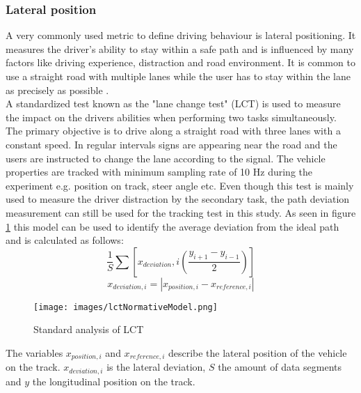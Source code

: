 \subsubsection{Lateral position}
\label{subsection:lateral position}
A very commonly used metric to define driving behaviour is lateral positioning. \autocite[37]{ostlund2005driving}
It measures the driver’s ability to stay within a safe path and is influenced by many factors like driving experience, distraction and road environment.
It is common to use a straight road with multiple lanes while the user has to stay within the lane as precisely as possible \autocite[]{iso201026022} \autocite[]{brouwer1991divided}.
\\
A standardized test known as the "lane change test" (LCT) \autocite[]{iso201026022} is used to measure the impact on the drivers abilities when performing two tasks simultaneously.
The primary objective is to drive along a straight road with three lanes with a constant speed.
In regular intervals signs are appearing near the road and the users are instructed to change the lane according to the signal.
The vehicle properties are tracked with minimum sampling rate of 10 Hz during the experiment e.g. position on track, steer angle etc.
Even though this test is mainly used to measure the driver distraction by the secondary task, the path deviation measurement can still be used for the tracking test in this study.
As seen in figure \ref{figure:LCTNormative} this model can be used to identify the average deviation from the ideal path and is calculated as follows: \autocite[13]{iso201026022}
\begin{equation}
\label{equation:LCTMeanDeviation}
	\frac{1}{S}\sum[x_{deviation},i(\frac{y_{i+1}-y_{i-1}}{2})]
\end{equation}
\begin{equation}
\label{equation:deviation}
    x_{deviation,i} = |x_{position,i} - x_{reference,i}|
\end{equation}

\begin{figure}[h]
    \centering
	\texttt{[image: images/lctNormativeModel.png]}
	\caption[
		LCT normative model
	]{
		Standard analysis of LCT \autocite[77]{ostlund2005driving}
	}
	\label{figure:LCTNormative}
\end{figure}

The variables $x_{position,i}$ and $x_{reference,i}$ describe the lateral position of the vehicle on the track.
$x_{deviation,i}$ is the lateral deviation, $S$ the amount of data segments and $y$ the longitudinal position on the track.
\\


